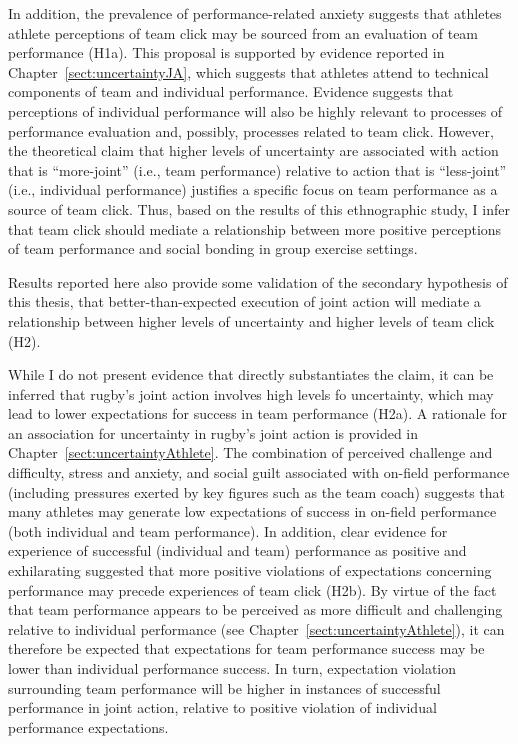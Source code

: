 \begin{CJK}{UTF8}{gbsn}
In addition, the prevalence of performance-related anxiety suggests that athletes athlete perceptions of team click may be sourced from an evaluation of team performance (H1a).  This proposal is supported by evidence reported in Chapter~\ref{sect:uncertaintyJA}, which suggests that athletes attend to technical components of team and individual performance. Evidence suggests that perceptions of individual performance will also be highly relevant to processes of performance evaluation and, possibly, processes related to team click.  However, the theoretical claim that higher levels of uncertainty are associated with action that is ``more-joint'' (i.e., team performance) relative to action that is ``less-joint'' (i.e., individual performance) justifies a specific focus on team performance as a source of team click. Thus, based on the results of this ethnographic study, I infer that team click should mediate a relationship between more positive perceptions of team performance and social bonding in group exercise settings.

Results reported here also provide some validation of the secondary hypothesis of this thesis, that better-than-expected execution of joint action will mediate a relationship between higher levels of uncertainty and higher levels of team click (H2).

While I do not present evidence that directly substantiates the claim, it can be inferred that rugby's joint action involves high levels fo uncertainty, which may lead to lower expectations for success in team performance (H2a).  A rationale for an association for uncertainty in rugby's joint action is provided in Chapter~\ref{sect:uncertaintyAthlete}.  The combination of perceived challenge and difficulty, stress and anxiety, and social guilt associated with on-field performance (including pressures exerted by key figures such as the team coach) suggests that many athletes may generate low expectations of success in on-field performance (both individual and team performance).   In addition, clear evidence for experience of successful (individual and team) performance as positive and exhilarating suggested that more positive violations of expectations concerning performance may precede experiences of team click (H2b).  By virtue of the fact that team performance appears to be perceived as more difficult and challenging relative to individual performance (see Chapter~\ref{sect:uncertaintyAthlete}), it can therefore be expected that expectations for team performance success may be lower than individual performance success. In turn, expectation violation surrounding team performance will be higher in instances of successful performance in joint action, relative to positive violation of individual performance expectations.


\end{CJK}
